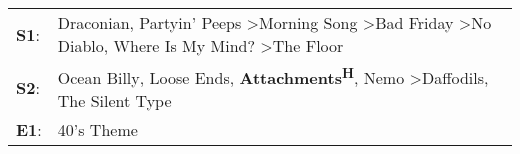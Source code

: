 \begin{supertabular}{p{0.03\textwidth}p{0.92\textwidth}}
 \textbf{S1}:  &  Draconian\textsuperscript{}, \enspace Partyin' Peeps\textsuperscript{} \textgreater \enspace Morning Song\textsuperscript{} \textgreater \enspace Bad Friday\textsuperscript{} \textgreater \enspace No Diablo\textsuperscript{}, \enspace Where Is My Mind?\textsuperscript{} \textgreater \enspace The Floor\textsuperscript{}  \enspace  \\
 \textbf{S2}:  &                                                                             Ocean Billy\textsuperscript{}, \enspace Loose Ends\textsuperscript{}, \enspace \textbf{Attachments\textsuperscript{H}}, \enspace Nemo\textsuperscript{} \textgreater \enspace Daffodils\textsuperscript{}, \enspace The Silent Type\textsuperscript{}  \enspace  \\
 \textbf{E1}:  &                                                                                                                                                                                                                                                                                                      40's Theme\textsuperscript{}  \enspace  \\
\end{supertabular}
